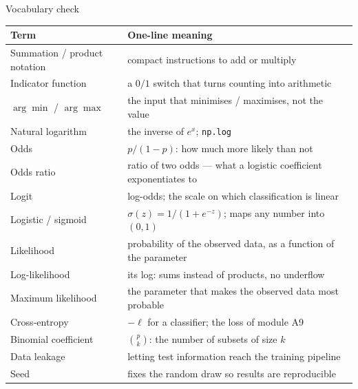 \documentclass[aspectratio=169,11pt]{beamer}
\begin{document}
\begin{frame}{Vocabulary check}
  \scriptsize
  \begin{center}
  \begin{tabular}{@{}ll@{}}
    \toprule
    \textbf{Term} & \textbf{One-line meaning} \\
    \midrule
    Summation / product notation & compact instructions to add or multiply \\
    Indicator function & a $0/1$ switch that turns counting into arithmetic \\
    $\arg\min$ / $\arg\max$ & the input that minimises / maximises, not the value \\
    Natural logarithm & the inverse of $e^x$; \texttt{np.log} \\
    Odds & $p/(1-p)$: how much more likely than not \\
    Odds ratio & ratio of two odds --- what a logistic coefficient exponentiates to \\
    Logit & log-odds; the scale on which classification is linear \\
    Logistic / sigmoid & $\sigma(z) = 1/(1+e^{-z})$; maps any number into $(0,1)$ \\
    Likelihood & probability of the observed data, as a function of the parameter \\
    Log-likelihood & its log: sums instead of products, no underflow \\
    Maximum likelihood & the parameter that makes the observed data most probable \\
    Cross-entropy & $-\ell$ for a classifier; the loss of module A9 \\
    Binomial coefficient & $\binom{p}{k}$: the number of subsets of size $k$ \\
    Data leakage & letting test information reach the training pipeline \\
    Seed & fixes the random draw so results are reproducible \\
    \bottomrule
  \end{tabular}
  \end{center}
\end{frame}
\end{document}
